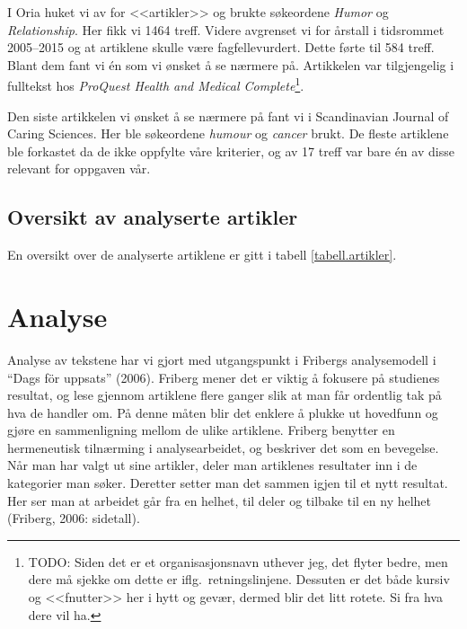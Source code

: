 I Oria huket vi av for <<artikler>> og brukte søkeordene \textit{Humor} og
\textit{Relationship}. Her fikk vi 1464 treff. Videre avgrenset vi for årstall
i tidsrommet 2005--2015 og at artiklene skulle være fagfellevurdert. Dette
førte til 584 treff. Blant dem fant vi én som vi ønsket å se nærmere på.
Artikkelen var tilgjengelig i fulltekst hos \textit{ProQuest Health and Medical
Complete}\footnote{TODO: Siden det er et organisasjonsnavn uthever jeg, det
flyter bedre, men dere må sjekke om dette er iflg.~retningslinjene. Dessuten er
det både kursiv og <<fnutter>> her i hytt og gevær, dermed blir det litt
rotete. Si fra hva dere vil ha.}.

Den siste artikkelen vi ønsket å se nærmere på fant vi i Scandinavian Journal
of Caring Sciences. Her ble søkeordene \textit{humour} og \textit{cancer}
brukt. De fleste artiklene ble forkastet da de ikke oppfylte våre kriterier, og
av 17 treff var bare én av disse relevant for oppgaven vår.

\subsection{Oversikt av analyserte artikler}

En oversikt over de analyserte artiklene er gitt i tabell
\vref{tabell.artikler}.



\section{Analyse}

Analyse av tekstene har vi gjort med utgangspunkt i Fribergs analysemodell i
“Dags för uppsats” (2006). Friberg mener det er viktig å fokusere på studienes
resultat, og lese gjennom artiklene flere ganger slik at man får ordentlig tak
på hva de handler om. På denne måten blir det enklere å plukke ut hovedfunn og
gjøre en sammenligning mellom de ulike artiklene. Friberg benytter en
hermeneutisk tilnærming i analysearbeidet, og beskriver det som en bevegelse.
Når man har valgt ut sine artikler, deler man artiklenes resultater inn i de
kategorier man søker. Deretter setter man det sammen igjen til et nytt
resultat. Her ser man at arbeidet går fra en helhet, til deler og tilbake til
en ny helhet (Friberg, 2006: sidetall).

